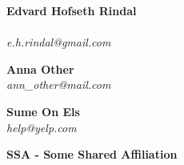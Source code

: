 \textbf{Edvard Hofseth Rindal}\\
\\
\textit{e.h.rindal@gmail.com}

\begin{multicols}{2}
\textbf{Anna Other}\\
\textit{ann\_other@mail.com}

\textbf{Sume On Els}\\
\textit{help@yelp.com}
\end{multicols}
\textbf{SSA - Some Shared Affiliation}
